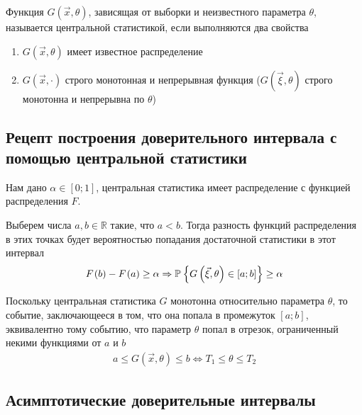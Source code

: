 \begin{definition}
    Функция $G\left( \vec{x}, \theta \right)$, зависящая от выборки и
    неизвестного параметра $\theta$, называется центральной статистикой,
    если выполняются два свойства
    \begin{enumerate}
        \item $G\left( \vec{x}, \theta \right)$ имеет известное распределение
        \item $G\left( \vec{x}, \cdot \right)$ строго монотонная и непрерывная
            функция ($G\left( \vec{\xi}, \theta \right)$ строго монотонна и
            непрерывна по $\theta$)
    \end{enumerate}
\end{definition}

\subsection{Рецепт построения доверительного интервала с помощью центральной
    статистики}

Нам дано $\alpha \in \left[ 0; 1 \right]$, центральная статистика имеет
распределение с функцией распределения $F$.

Выберем числа $a, b \in \mathbb{R}$ такие, что $a < b$. Тогда разность функций
распределения в этих точках будет вероятностью попадания достаточной статистики
в этот интервал
\begin{align*}
    F_{}\left(b\right) - F_{}\left(a\right) \ge \alpha \Rightarrow
    \mathbb{P}_{{}}\left\{ G\left( \vec{\xi}, \theta \right) \in \left[ a; b \right] \right\}
    \ge \alpha
\end{align*}

Поскольку центральная статистика $G$ монотонна относительно параметра $\theta$,
то событие, заключающееся в том, что она попала в промежуток
$\left[ a; b \right]$, эквивалентно тому событию, что параметр $\theta$ попал
в отрезок, ограниченный некими функциями от $a$ и $b$
\begin{align*}
    a \le G\left( \vec{x}, \theta \right) \le b
    \Leftrightarrow T_1 \le \theta \le T_2
\end{align*}

\subsection{Асимптотические доверительные интервалы}

